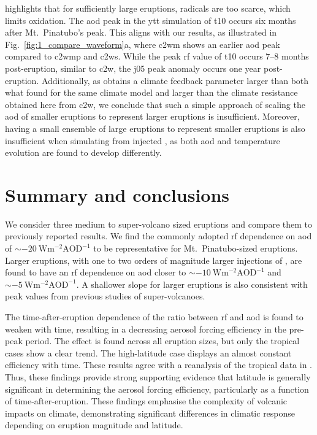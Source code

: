 \documentclass{ametsocV6.1}
\newcommand{\iso}[1][i]{{#1}njected \ce{SO2}}
\begin{document}
\citet{timmreck2010} highlights that for sufficiently large eruptions,  radicals
are too scarce, which limits  oxidation. The \gls{aod} peak in the \gls{ytt}
simulation of \gls{t10} occurs six months after Mt.\ Pinatubo's peak. This aligns with
our results, as illustrated in Fig.~\ref{fig:1_compare_waveform}a, where \gls{c2wm}
shows an earlier \gls{aod} peak compared to \gls{c2wmp} and \gls{c2ws}. While the peak
\gls{rf} value of \gls{t10} occurs \(7\)--\(8\) months post-eruption, similar to
\gls{c2w}, the \gls{j05} peak anomaly occurs one year post-eruption. Additionally, as
\citet{jones2005} obtains a climate feedback parameter larger than both what
\citet{gregory2016} found for the same climate model and larger than the climate
resistance obtained here from \gls{c2w}, we conclude that such a simple approach of
scaling the \gls{aod} of smaller eruptions to represent larger eruptions is
insufficient. Moreover, having a small ensemble of large eruptions to represent smaller
eruptions is also insufficient when simulating from \iso{}, as both \gls{aod} and
temperature evolution are found to develop differently.

\section{Summary and conclusions}\label{sec:conclusions}

We consider three medium to super-volcano sized eruptions and compare them to previously
reported results. We find the commonly adopted \gls{rf} dependence on \gls{aod} of
\(\sim\SI{-20}{\watt\metre^{-2}\mathrm{AOD}^{-1}}\) to be representative for Mt.\
Pinatubo-sized eruptions. Larger eruptions, with one to two orders of magnitude larger
injections of \ce{SO2}, are found to have an \gls{rf} dependence on \gls{aod} closer to
\(\sim\SI{-10}{\watt\metre^{-2}\mathrm{AOD}^{-1}}\) and
\(\sim\SI{-5}{\watt\metre^{-2}\mathrm{AOD}^{-1}}\). A shallower slope for larger
eruptions is also consistent with peak values from previous studies of super-volcanoes.

The time-after-eruption dependence of the ratio between \gls{rf} and \gls{aod} is found
to weaken with time, resulting in a decreasing aerosol forcing efficiency in the
pre-peak period. The effect is found across all eruption sizes, but only the tropical
cases show a clear trend. The high-latitude case displays an almost constant efficiency
with time. These results agree with a reanalysis of the tropical data in
\citet{marshall2020dataset}. Thus, these findings provide strong supporting evidence
that latitude is generally significant in determining the aerosol forcing efficiency,
particularly as a function of time-after-eruption. These findings emphasise the
complexity of volcanic impacts on climate, demonstrating significant differences in
climatic response depending on eruption magnitude and latitude.
\end{document}
